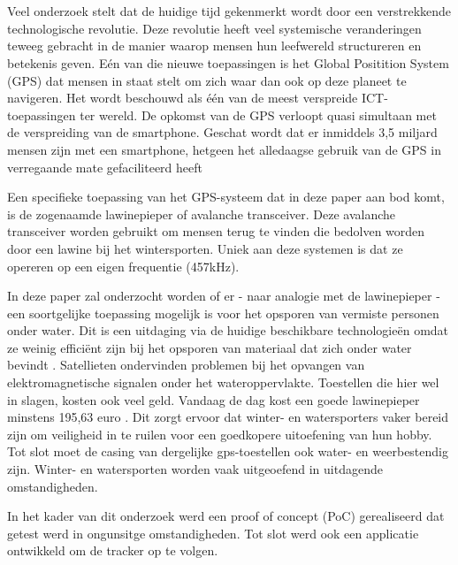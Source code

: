 
\chapter{}
\label{ch:inleiding}
Veel onderzoek stelt dat de huidige tijd gekenmerkt wordt door een verstrekkende technologische revolutie. Deze revolutie heeft veel systemische veranderingen teweeg gebracht in de manier waarop mensen hun leefwereld structureren en betekenis geven. Eén van die nieuwe toepassingen is het Global Positition System (GPS) dat mensen in staat stelt om zich waar dan ook op deze planeet te navigeren. Het wordt beschouwd als één van de meest verspreide ICT-toepassingen ter wereld. De opkomst van de GPS verloopt quasi simultaan met de verspreiding van de smartphone. Geschat wordt dat er inmiddels 3,5 miljard mensen zijn met een smartphone, hetgeen het alledaagse gebruik van de GPS in verregaande mate gefaciliteerd heeft \autocite{numberOfSmartphones}

Een specifieke toepassing van het GPS-systeem dat in deze paper aan bod komt, is de zogenaamde lawinepieper of avalanche transceiver. Deze avalanche transceiver worden gebruikt om mensen terug te vinden die bedolven worden door een lawine bij het wintersporten. Uniek aan deze systemen is dat ze opereren op een eigen frequentie (457kHz).

In deze paper zal onderzocht worden of er - naar analogie met de lawinepieper - een soortgelijke toepassing mogelijk is voor het opsporen van vermiste personen onder water. Dit is een uitdaging via de huidige beschikbare technologieën omdat ze weinig efficiënt zijn bij het opsporen van materiaal dat zich onder water bevindt \autocite{underwaterProblem}. Satellieten ondervinden problemen bij het opvangen van elektromagnetische signalen onder het wateroppervlakte. Toestellen die hier wel in slagen, kosten ook veel geld. Vandaag de dag kost een goede lawinepieper minstens 195,63 euro \autocite{price_avalanche}. Dit zorgt ervoor dat winter- en watersporters vaker bereid zijn om veiligheid in te ruilen voor een goedkopere uitoefening van hun hobby. Tot slot moet de casing van dergelijke gps-toestellen ook water- en weerbestendig zijn. Winter- en watersporten worden vaak uitgeoefend in uitdagende omstandigheden.

In het kader van dit onderzoek werd een proof of concept (PoC) gerealiseerd dat getest werd in ongunsitge omstandigheden. Tot slot werd ook een applicatie ontwikkeld om de tracker op te volgen.


